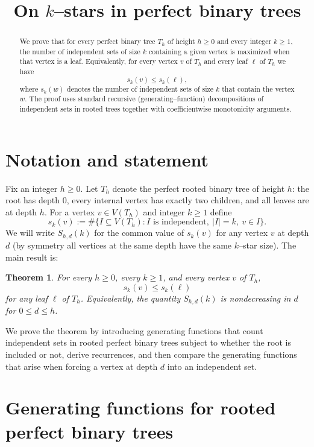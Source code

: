 \documentclass[11pt]{article}
\newtheorem{theorem}{Theorem}[section]
\begin{document}
\title{On $k$--stars in perfect binary trees}
\author{}
\date{}
\maketitle

\begin{abstract}
	We prove that for every perfect binary tree $T_h$ of height $h\ge 0$ and every integer $k\ge1$, the number of independent sets of size $k$ containing a given vertex is maximized when that vertex is a leaf. Equivalently, for every vertex $v$ of $T_h$ and every leaf $\ell$ of $T_h$ we have
	\[
		s_k(v)\le s_k(\ell),
	\]
	where $s_k(w)$ denotes the number of independent sets of size $k$ that contain the vertex $w$. The proof uses standard recursive (generating--function) decompositions of independent sets in rooted trees together with coefficientwise monotonicity arguments.
\end{abstract}

\section{Notation and statement}

Fix an integer $h\ge0$. Let $T_h$ denote the perfect rooted binary tree of height $h$: the root has depth $0$, every internal vertex has exactly two children, and all leaves are at depth $h$. For a vertex $v\in V(T_h)$ and integer $k\ge1$ define
\[
	s_k(v):=\#\{I\subseteq V(T_h): I\text{ is independent},\ |I|=k,\ v\in I\}.
\]
We will write $S_{h,d}(k)$ for the common value of $s_k(v)$ for any vertex $v$ at depth $d$ (by symmetry all vertices at the same depth have the same $k$--star size). The main result is:

\begin{theorem}\label{thm:main}
	For every $h\ge0$, every $k\ge1$, and every vertex $v$ of $T_h$,
	\[
		s_k(v)\le s_k(\ell)
	\]
	for any leaf $\ell$ of $T_h$. Equivalently, the quantity $S_{h,d}(k)$ is nondecreasing in $d$ for $0\le d\le h$.
\end{theorem}

We prove the theorem by introducing generating functions that count independent sets in rooted perfect binary trees subject to whether the root is included or not, derive recurrences, and then compare the generating functions that arise when forcing a vertex at depth $d$ into an independent set.

\section{Generating functions for rooted perfect binary trees}
\end{document}
